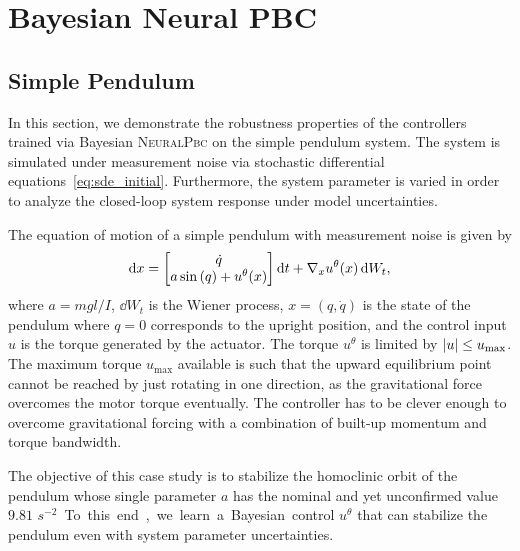 
\section{Bayesian Neural PBC}
\subsection{Simple Pendulum}

In this section, we demonstrate the robustness properties of the controllers
trained via Bayesian \textsc{NeuralPbc} on the simple pendulum system. The system is
simulated under measurement noise via stochastic differential
equations~\eqref{eq:sde_initial}. Furthermore, the system parameter is varied in
order to analyze the closed-loop system response under model uncertainties. 

The equation of motion of a simple pendulum with measurement noise is given by
%
\begin{equation}
    \operatorname{d}\! x = \begin{bmatrix}
        \dot{q} \\ 
        a \sin{(q)} + u^\theta(x)
    \end{bmatrix} \operatorname{d}\! t+ \nabla_x u^\theta(x) \operatorname{d}\! W_t,
    \label{eq:pendulum_sde}
\end{equation}
%
where $a=mgl/I$, $\dd W_t$ is the Wiener process, $x = (q,
\dot{q})$ is the state of the pendulum where $q = 0$ corresponds
to the upright position, and the control input $u$ is the torque generated by
the actuator. 
%
The torque \(u^\theta\) is limited by \(\left|{u}\right| \leq u_{\textrm{max}}\).
%
The maximum torque $u_{\textrm{max}}$ available is such that the upward
equilibrium point cannot be reached by just rotating in one direction, as the
gravitational force overcomes the motor torque eventually. The controller has to
be clever enough to overcome gravitational forcing with a combination of
built-up momentum and torque bandwidth.

The objective of this case study is to stabilize the homoclinic orbit of the
pendulum whose single parameter $a$ has the nominal and yet unconfirmed value
$9.81$ \unit{$s^{-2}$}. To this end, we learn a Bayesian control $u^\theta$ that
can stabilize the pendulum even with system parameter uncertainties.

